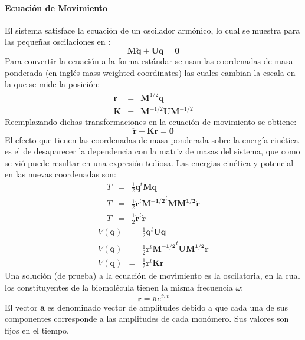 \paragraph{Ecuaci\'{o}n de Movimiento}\label{par:Ecmov}
El sistema satisface la ecuaci\'{o}n de un oscilador arm\'{o}nico, lo cual se muestra para las peque\~{n}as oscilaciones en \cite[Chapter~6]{Goldstein2001}:
\begin{equation}\label{eq:14}
\mathbf{M}\ddot{\mathbf{q}}+\mathbf{U}\mathbf{q}=\mathbf{0}
\end{equation}
Para convertir la ecuaci\'{o}n a la forma est\'{a}ndar se usan las coordenadas de masa ponderada (en ingl\'{e}s mass-weighted coordinates) las cuales cambian la escala en la que se mide la posici\'{o}n:
\begin{eqnarray}\label{eq:15}
\mathbf{r}&=&\mathbf{M}^{1/2}\mathbf{q}\\
\mathbf{K}&=&\mathbf{M}^{-1/2}\mathbf{U}\mathbf{M}^{-1/2}\nonumber
\end{eqnarray}
Reemplazando dichas transformaciones en la ecuaci\'{o}n de movimiento se obtiene:
\begin{equation}\label{eq:16}
\ddot{\mathbf{r}}+\mathbf{K}\mathbf{r}=\mathbf{0}
\end{equation}
El efecto que tienen las coordenadas de masa ponderada sobre la energ\'{i}a cin\'{e}tica  es el de desaparecer la dependencia con la matriz de masas del sistema, que como se vi\'{o} puede resultar en una expresi\'{o}n tediosa. Las energias cin\'{e}tica y potencial en las nuevas coordenadas son:
\begin{eqnarray}\label{eq:19}
T&=&\frac{1}{2}\mathbf{q}^t\mathbf{M}\mathbf{q} \nonumber \\
T&=&\frac{1}{2}\mathbf{\dot{r}}^t\mathbf{M^{-1/2}}^t\mathbf{M}\mathbf{M^{1/2}}\mathbf{\dot{r}}\nonumber \\
T&=&\frac{1}{2}\mathbf{\dot{r}}^t \mathbf{\dot{r}}
\end{eqnarray}
\begin{eqnarray}\label{eq:20}
V(\mathbf{q})&=&\frac{1}{2}\mathbf{q}^t\mathbf{U}\mathbf{q} \nonumber \\
V(\mathbf{q})&=&\frac{1}{2}\mathbf{r}^t\mathbf{M^{-1/2}}^t\mathbf{U}\mathbf{M^{1/2}}\mathbf{r} \nonumber \\
V(\mathbf{q})&=&\frac{1}{2}\mathbf{r}^t\mathbf{K}\mathbf{r}
\end{eqnarray}
Una soluci\'{o}n (de prueba) a la ecuaci\'{o}n de movimiento es la oscilatoria, en la cual los constituyentes de la biomol\'{e}cula tienen la misma frecuencia $\omega$:
\begin{equation}\label{eq:17}
\mathbf{r}=\mathbf{a}e^{i\omega t}
\end{equation}
El vector $\mathbf{a}$ es denominado vector de amplitudes debido a que cada una de sus componentes corresponde a las amplitudes de cada mon\'{o}mero. Sus valores son fijos en el tiempo.\\

